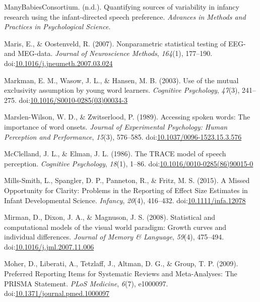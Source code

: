 \documentclass[man]{apa6}
\begin{document}
\leavevmode\hypertarget{ref-MB1}{}%
ManyBabiesConsortium. (n.d.). Quantifying sources of variability in infancy research using the infant-directed speech preference. \emph{Advances in Methods and Practices in Psychological Science}.

\leavevmode\hypertarget{ref-Maris2007}{}%
Maris, E., \& Oostenveld, R. (2007). Nonparametric statistical testing of EEG- and MEG-data. \emph{Journal of Neuroscience Methods}, \emph{164}(1), 177--190. doi:\href{https://doi.org/10.1016/j.jneumeth.2007.03.024}{10.1016/j.jneumeth.2007.03.024}

\leavevmode\hypertarget{ref-Markman2003}{}%
Markman, E. M., Wasow, J. L., \& Hansen, M. B. (2003). Use of the mutual exclusivity assumption by young word learners. \emph{Cognitive Psychology}, \emph{47}(3), 241--275. doi:\href{https://doi.org/10.1016/S0010-0285(03)00034-3}{10.1016/S0010-0285(03)00034-3}

\leavevmode\hypertarget{ref-Marslen-Wilson1989}{}%
Marslen-Wilson, W. D., \& Zwitserlood, P. (1989). Accessing spoken words: The importance of word onsets. \emph{Journal of Experimental Psychology: Human Perception and Performance}, \emph{15}(3), 576--585. doi:\href{https://doi.org/10.1037/0096-1523.15.3.576}{10.1037/0096-1523.15.3.576}

\leavevmode\hypertarget{ref-McClelland1986}{}%
McClelland, J. L., \& Elman, J. L. (1986). The TRACE model of speech perception. \emph{Cognitive Psychology}, \emph{18}(1), 1--86. doi:\href{https://doi.org/10.1016/0010-0285(86)90015-0}{10.1016/0010-0285(86)90015-0}

\leavevmode\hypertarget{ref-Mills-Smith2015}{}%
Mills-Smith, L., Spangler, D. P., Panneton, R., \& Fritz, M. S. (2015). A Missed Opportunity for Clarity: Problems in the Reporting of Effect Size Estimates in Infant Developmental Science. \emph{Infancy}, \emph{20}(4), 416--432. doi:\href{https://doi.org/10.1111/infa.12078}{10.1111/infa.12078}

\leavevmode\hypertarget{ref-Mirman2008}{}%
Mirman, D., Dixon, J. A., \& Magnuson, J. S. (2008). Statistical and computational models of the visual world paradigm: Growth curves and individual differences. \emph{Journal of Memory \& Language}, \emph{59}(4), 475--494. doi:\href{https://doi.org/10.1016/j.jml.2007.11.006}{10.1016/j.jml.2007.11.006}

\leavevmode\hypertarget{ref-Moher2009}{}%
Moher, D., Liberati, A., Tetzlaff, J., Altman, D. G., \& Group, T. P. (2009). Preferred Reporting Items for Systematic Reviews and Meta-Analyses: The PRISMA Statement. \emph{PLoS Medicine}, \emph{6}(7), e1000097. doi:\href{https://doi.org/10.1371/journal.pmed.1000097}{10.1371/journal.pmed.1000097}
\end{document}
